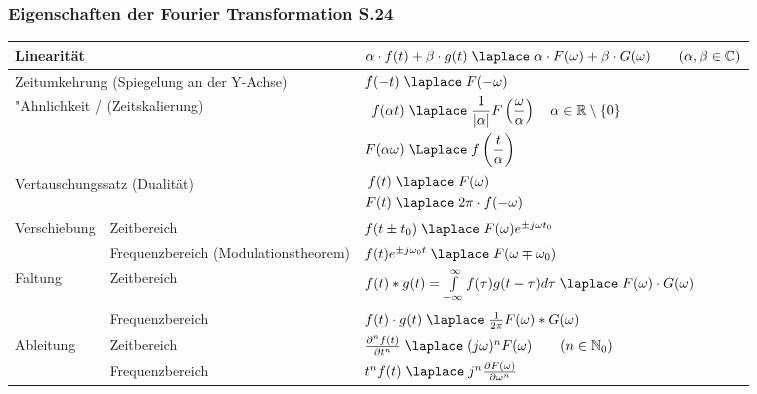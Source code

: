 \subsubsection{Eigenschaften der Fourier Transformation S.24}
\renewcommand{\arraystretch}{2}
\begin{tabular}{|p{2.5cm}|p{6cm}|p{8.5cm}|}
	\hline
	\multicolumn{2}{|l}{Linearität} & $\alpha\cdot f(t) + \beta\cdot g(t) \; \laplace \; \alpha\cdot F(\omega) +\beta\cdot G(\omega) \qquad (\alpha, \beta \in \mathbb{C})$  \\ 
	\hline
	\multicolumn{2}{|l}{Zeitumkehrung (Spiegelung an der Y-Achse)} & $f(-t) \; \laplace \; F(-\omega)$ \\
	\hline
	\multicolumn{2}{|l}{"Ahnlichkeit / (Zeitskalierung)}             &      		$\begin{aligned}f(\alpha t) \; &\laplace \; \frac{1}{|\alpha|}F \left (\frac{\omega}{\alpha} \right)
		\quad\alpha \in\mathbb{R}\setminus \{0\}\\
		F(\alpha\omega) \; &\Laplace \; f\left(\frac{t}{\alpha}\right)\end{aligned}$\\ 
	\hline
	\multicolumn{2}{|l}{Vertauschungssatz (Dualität)}              & 
	\begin{math}
		\begin{aligned}
			f(t) \; &\laplace \; F(\omega)\nonumber \\ 
			F(t) \; &\laplace \; 2\pi \cdot f(-\omega)
		\end{aligned}
	\end{math}\\ 
	\hline
	\hline
	\multirow{2}{*}{Verschiebung} & Zeitbereich & $f(t\pm t_0) \; \laplace \; F(\omega)e^{\pm j\omega t_0}$ \\ 
	\cline{2-3} 
	& Frequenzbereich (Modulationstheorem) & $f(t)e^{\pm j\omega_0 t} \; \laplace \; F(\omega\mp\omega_0)$ \\ 
	\hline
	\hline
	\multirow{2}{*}{Faltung} & Zeitbereich & $f(t) \ast g(t) = \int\limits_{-\infty}^{\infty} f(\tau)g(t-\tau)d\tau \; \laplace \;
	F(\omega) \cdot G(\omega)$ \\ 
	\cline{2-3} 
	& Frequenzbereich & $f(t) \cdot g(t) \; \laplace \; \frac{1}{2\pi}F(\omega) \ast G(\omega)$ \\ 
	\hline
	\hline
	\multirow{2}{*}{Ableitung} & Zeitbereich & $\frac{\partial^n f(t)}{\partial t^n} \; \laplace \; (j\omega)^n F(\omega) \qquad (n \in \mathbb{N}_0)$ \\ 
	\cline{2-3} 
	& Frequenzbereich &  $t^n f(t) \; \laplace \; j^n \frac{\partial F(\omega)}{\partial \omega^n}$\\ 

\end{tabular}

